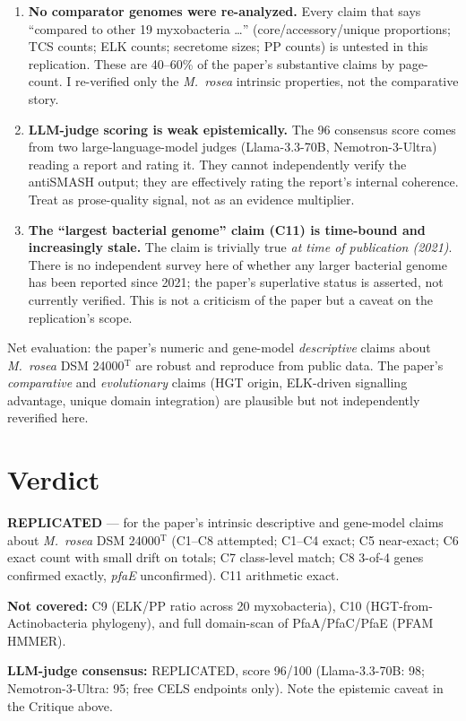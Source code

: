 \documentclass[11pt,letterpaper]{article}
\begin{document}
\begin{enumerate}
\item \textbf{No comparator genomes were re-analyzed.} Every claim that says ``compared to other 19 myxobacteria \ldots'' (core/accessory/unique proportions; TCS counts; ELK counts; secretome sizes; PP counts) is untested in this replication. These are 40--60\% of the paper's substantive claims by page-count. I re-verified only the \emph{M.\ rosea} intrinsic properties, not the comparative story.
\item \textbf{LLM-judge scoring is weak epistemically.} The 96 consensus score comes from two large-language-model judges (Llama-3.3-70B, Nemotron-3-Ultra) reading a report and rating it. They cannot independently verify the antiSMASH output; they are effectively rating the report's internal coherence. Treat as prose-quality signal, not as an evidence multiplier.
\item \textbf{The ``largest bacterial genome'' claim (C11) is time-bound and increasingly stale.} The claim is trivially true \emph{at time of publication (2021)}. There is no independent survey here of whether any larger bacterial genome has been reported since 2021; the paper's superlative status is asserted, not currently verified. This is not a criticism of the paper but a caveat on the replication's scope.
\end{enumerate}

Net evaluation: the paper's numeric and gene-model \emph{descriptive} claims about \emph{M.\ rosea} DSM 24000$^{\mathrm{T}}$ are robust and reproduce from public data. The paper's \emph{comparative} and \emph{evolutionary} claims (HGT origin, ELK-driven signalling advantage, unique domain integration) are plausible but not independently reverified here.

\section{Verdict}

\textbf{REPLICATED} --- for the paper's intrinsic descriptive and gene-model claims about \emph{M.\ rosea} DSM 24000$^{\mathrm{T}}$ (C1--C8 attempted; C1--C4 exact; C5 near-exact; C6 exact count with small drift on totals; C7 class-level match; C8 3-of-4 genes confirmed exactly, \emph{pfaE} unconfirmed). C11 arithmetic exact.

\textbf{Not covered:} C9 (ELK/PP ratio across 20 myxobacteria), C10 (HGT-from-Actinobacteria phylogeny), and full domain-scan of PfaA/PfaC/PfaE (PFAM HMMER).

\textbf{LLM-judge consensus:} REPLICATED, score 96/100 (Llama-3.3-70B: 98; Nemotron-3-Ultra: 95; free CELS endpoints only). Note the epistemic caveat in the Critique above.
\end{document}
